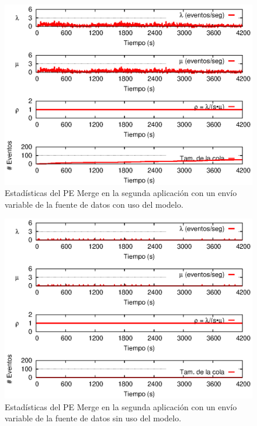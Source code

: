 \begin{figure}[!ht]
\centering
    \includegraphics[scale=1.1]{images/exp/app2/normal/cm/statusMergePE.eps}
    \caption{Estad\'isticas del PE Merge en la segunda aplicaci\'on con un env\'io variable de la fuente de datos con uso del modelo.}
    \label{fig:app2-normal-statusMergePE-cm}
\end{figure}

\begin{figure}[!ht]
\centering
    \includegraphics[scale=1.1]{images/exp/app2/normal/sm/statusMergePE.eps}
    \caption{Estad\'isticas del PE Merge en la segunda aplicaci\'on con un env\'io variable de la fuente de datos sin uso del modelo.}
    \label{fig:app2-normal-statusMergePE-sm}
\end{figure}


